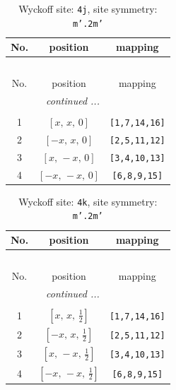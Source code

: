 \documentclass[fleqn,8pt]{jsarticle}
\begin{document}
\begin{longtable}{ccc}
\caption{Wyckoff site: {\tt 4j}, site symmetry: {\tt m'.2m'}}
 \\
 \hline \hline
No. & position & mapping \\ \hline \endfirsthead

\multicolumn{2}{l}{\tablename\ \thetable{}} \\
 \hline \hline
No. & position & mapping \\ \hline \endhead

 \hline \hline
\multicolumn{2}{r}{\footnotesize\it continued ...} \\ \endfoot

 \hline \hline
\multicolumn{2}{r}{} \\ \endlastfoot

1 & $\left[ x,\, x,\, 0 \right]$ & {\tt [1,7,14,16]} \\ \hline
2 & $\left[ - x,\, x,\, 0 \right]$ & {\tt [2,5,11,12]} \\ \hline
3 & $\left[ x,\, - x,\, 0 \right]$ & {\tt [3,4,10,13]} \\ \hline
4 & $\left[ - x,\, - x,\, 0 \right]$ & {\tt [6,8,9,15]} \\
\end{longtable}
\renewcommand{\arraystretch}{1.2}
\begin{longtable}{ccc}
\caption{Wyckoff site: {\tt 4k}, site symmetry: {\tt m'.2m'}}
 \\
 \hline \hline
No. & position & mapping \\ \hline \endfirsthead

\multicolumn{2}{l}{\tablename\ \thetable{}} \\
 \hline \hline
No. & position & mapping \\ \hline \endhead

 \hline \hline
\multicolumn{2}{r}{\footnotesize\it continued ...} \\ \endfoot

 \hline \hline
\multicolumn{2}{r}{} \\ \endlastfoot

1 & $\left[ x,\, x,\, \frac{1}{2} \right]$ & {\tt [1,7,14,16]} \\ \hline
2 & $\left[ - x,\, x,\, \frac{1}{2} \right]$ & {\tt [2,5,11,12]} \\ \hline
3 & $\left[ x,\, - x,\, \frac{1}{2} \right]$ & {\tt [3,4,10,13]} \\ \hline
4 & $\left[ - x,\, - x,\, \frac{1}{2} \right]$ & {\tt [6,8,9,15]} \\
\end{longtable}
\end{document}
